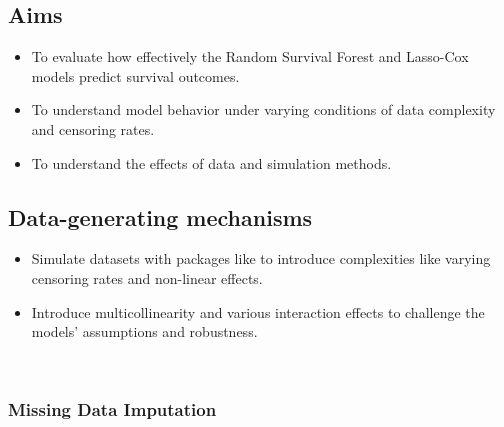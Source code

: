 \subsection{Aims}
\begin{itemize}
\item To evaluate how effectively the Random Survival Forest and Lasso-Cox models predict survival outcomes.
\item To understand model behavior under varying conditions of data complexity and censoring rates.
\item To understand the effects of data and simulation methods. 
\end{itemize}

\subsection{Data-generating mechanisms}
\begin{itemize}
\item Simulate datasets with packages like \parencite{davidson-pilon_lifelines_2024} to introduce complexities like varying censoring rates and non-linear effects.
\item Introduce multicollinearity and various interaction effects to challenge the models' assumptions and robustness.
\end{itemize}
\
\subsubsection*{Missing Data Imputation}

